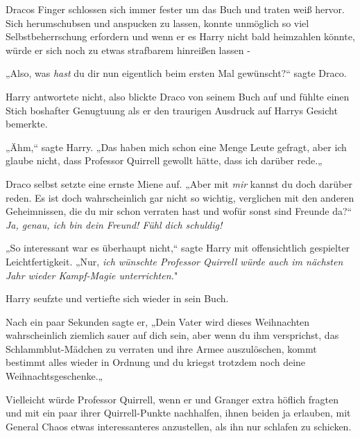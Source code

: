 {Dracos Finger schlossen sich immer fester um das Buch und traten weiß hervor. Sich herumschubsen und anspucken zu lassen, konnte unmöglich so viel Selbstbeherrschung erfordern und wenn er es Harry nicht bald heimzahlen könnte, würde er sich noch zu etwas strafbarem hinreißen lassen -

„Also, was \emph{hast} du dir nun eigentlich beim ersten Mal gewünscht?“ sagte Draco.

Harry antwortete nicht, also blickte Draco von seinem Buch auf und fühlte einen Stich boshafter Genugtuung als er den traurigen Ausdruck auf Harrys Gesicht bemerkte.

„Ähm,“ sagte Harry. „Das haben mich schon eine Menge Leute gefragt, aber ich glaube nicht, dass Professor Quirrell gewollt hätte, dass ich darüber rede.„

Draco selbst setzte eine ernste Miene auf. „Aber mit \emph{mir} kannst du doch darüber reden. Es ist doch wahrscheinlich gar nicht so wichtig, verglichen mit den anderen Geheimnissen, die du mir schon verraten hast und wofür sonst sind Freunde da?“ \emph{Ja, genau, ich bin dein Freund! Fühl dich schuldig!}

„So interessant war es überhaupt nicht,“ sagte Harry mit offensichtlich gespielter Leichtfertigkeit. „Nur, \emph{ich wünschte Professor Quirrell würde auch im nächsten Jahr wieder Kampf-Magie unterrichten.}"

Harry seufzte und vertiefte sich wieder in sein Buch.

Nach ein paar Sekunden sagte er, „Dein Vater wird dieses Weihnachten wahrscheinlich ziemlich sauer auf dich sein, aber wenn du ihm versprichst, das Schlammblut-Mädchen zu verraten und ihre Armee auszulöschen, kommt bestimmt alles wieder in Ordnung und du kriegst trotzdem noch deine Weihnachtsgeschenke.„

Vielleicht würde Professor Quirrell, wenn er und Granger extra höflich fragten und mit ein paar ihrer Quirrell-Punkte nachhalfen, ihnen beiden ja erlauben, mit General Chaos etwas interessanteres anzustellen, als ihn nur schlafen zu schicken.

}
